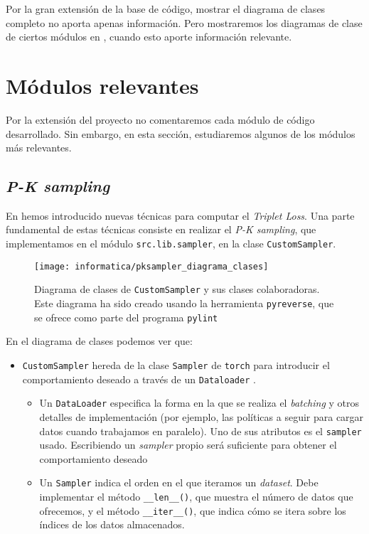 Por la gran extensión de la base de código, mostrar el diagrama de clases completo no aporta apenas información. Pero mostraremos los diagramas de clase de ciertos módulos en , cuando esto aporte información relevante.

\section{Módulos relevantes} \label{isec:modulos_relevantes}

Por la extensión del proyecto no comentaremos cada módulo de código desarrollado. Sin embargo, en esta sección, estudiaremos algunos de los módulos más relevantes.

\subsection{\textit{P-K sampling}}

En  hemos introducido nuevas técnicas para computar el \textit{Triplet Loss}. Una parte fundamental de estas técnicas consiste en realizar el \textit{P-K sampling}, que implementamos en el módulo \lstinline{src.lib.sampler}, en la clase \lstinline{CustomSampler}.

\begin{figure}[H]
    \centering
    \texttt{[image: informatica/pksampler\_diagrama\_clases]}
    \caption{Diagrama de clases de \lstinline{CustomSampler} y sus clases colaboradoras. Este diagrama ha sido creado usando la herramienta \lstinline{pyreverse}, que se ofrece como parte del programa \lstinline{pylint}}
    \label{img:diagrama_clases_CustomSampler}
\end{figure}

En el diagrama de clases  podemos ver que:

\begin{itemize}
    \item \lstinline{CustomSampler} hereda de la clase \lstinline{Sampler} de \lstinline{torch} para introducir el comportamiento deseado a través de un \lstinline{Dataloader} \cite{informatica:pytorch_sampler}.
        \begin{itemize}
            \item Un \lstinline{DataLoader} especifica la forma en la que se realiza el \textit{batching} y otros detalles de implementación (por ejemplo, las políticas a seguir para cargar datos cuando trabajamos en paralelo). Uno de sus atributos es el \lstinline{sampler} usado. Escribiendo un \textit{sampler} propio será suficiente para obtener el comportamiento deseado
            \item Un \lstinline{Sampler} indica el orden en el que iteramos un \textit{dataset}. Debe implementar el método \lstinline{__len__()}, que muestra el número de datos que ofrecemos, y el método \lstinline{__iter__()}, que indica cómo se itera sobre los índices de los datos almacenados.
        \end{itemize}
\end{itemize}

